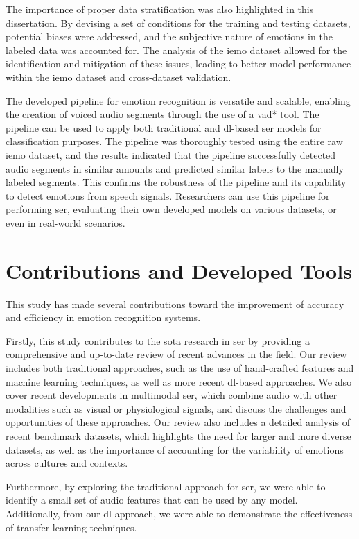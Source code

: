 The importance of proper data stratification was also highlighted in this dissertation. By devising a set of conditions for the training and testing datasets, potential biases were addressed, and the subjective nature of emotions in the labeled data was accounted for. The analysis of the \ac{iemo} dataset allowed for the identification and mitigation of these issues, leading to better model performance within the \ac{iemo} dataset and cross-dataset validation.

The developed pipeline for emotion recognition is versatile and scalable, enabling the creation of voiced audio segments through the use of a \ac{vad*} tool. The pipeline can be used to apply both traditional and \ac{dl}-based \ac{ser} models for classification purposes. The pipeline was thoroughly tested using the entire raw \ac{iemo} dataset, and the results indicated that the pipeline successfully detected audio segments in similar amounts and predicted similar labels to the manually labeled segments. This confirms the robustness of the pipeline and its capability to detect emotions from speech signals. Researchers can use this pipeline for performing \ac{ser}, evaluating their own developed models on various datasets, or even in real-world scenarios.

\section{Contributions and Developed Tools}

This study has made several contributions toward the improvement of accuracy and efficiency in emotion recognition systems.

Firstly, this study contributes to the \ac{sota} research in \ac{ser} by providing a comprehensive and up-to-date review of recent advances in the field. Our review includes both traditional approaches, such as the use of hand-crafted features and machine learning techniques, as well as more recent \ac{dl}-based approaches. We also cover recent developments in multimodal \ac{ser}, which combine audio with other modalities such as visual or physiological signals, and discuss the challenges and opportunities of these approaches. Our review also includes a detailed analysis of recent benchmark datasets, which highlights the need for larger and more diverse datasets, as well as the importance of accounting for the variability of emotions across cultures and contexts.

Furthermore, by exploring the traditional approach for \ac{ser}, we were able to identify a small set of audio features that can be used by any model. Additionally, from our \ac{dl} approach, we were able to demonstrate the effectiveness of transfer learning techniques.

